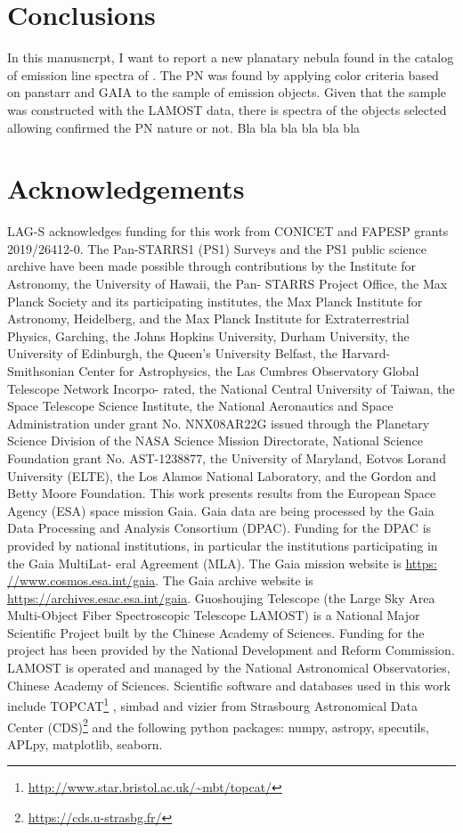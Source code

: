 \documentclass[fleqn,usenatbib]{mnras}
\begin{document}
{\section{Conclusions}
\label{sec:conclu}

In this manusncrpt, I want to report a new planatary nebula found
in the catalog of emission line spectra of \citet{Skoda:2020}.
The PN was found by applying color criteria based on panstarr
and GAIA to the sample of emission objects.
Given that the \citet{Skoda:2020} sample was constructed
with the LAMOST data, there is spectra of the objects selected
allowing confirmed the PN nature or not.
Bla bla bla bla bla bla

\section*{Acknowledgements}

LAG-S acknowledges funding for this work
from CONICET and FAPESP grants 2019/26412-0.
The Pan-STARRS1 (PS1) Surveys and the PS1 public science
archive have been made possible through contributions by the
Institute for Astronomy, the University of Hawaii, the Pan-
STARRS Project Office, the Max Planck Society and its
participating institutes, the Max Planck Institute for Astronomy,
Heidelberg, and the Max Planck Institute for Extraterrestrial
Physics, Garching, the Johns Hopkins University, Durham
University, the University of Edinburgh, the Queen’s University
Belfast, the Harvard-Smithsonian Center for Astrophysics, the
Las Cumbres Observatory Global Telescope Network Incorpo-
rated, the National Central University of Taiwan, the Space
Telescope Science Institute, the National Aeronautics and Space
Administration under grant No. NNX08AR22G issued through
the Planetary Science Division of the NASA Science Mission
Directorate, National Science Foundation grant No. AST-1238877,
the University of Maryland, Eotvos Lorand University
(ELTE), the Los Alamos National Laboratory, and the Gordon
and Betty Moore Foundation.
This work presents results from the European Space Agency
(ESA) space mission Gaia. Gaia data are being processed by
the Gaia Data Processing and Analysis Consortium (DPAC).
Funding for the DPAC is provided by national institutions, in
particular the institutions participating in the Gaia MultiLat-
eral Agreement (MLA). The Gaia mission website is \url{https:
//www.cosmos.esa.int/gaia}. The Gaia archive website is
\url{https://archives.esac.esa.int/gaia}.
Guoshoujing Telescope (the Large Sky Area Multi-Object Fiber Spectroscopic
Telescope LAMOST) is a National Major Scientific Project built by the Chinese
Academy of Sciences. Funding for the project has been provided by the National
Development and Reform Commission. LAMOST is operated and managed by the
National Astronomical Observatories, Chinese Academy of Sciences.
Scientific software
and databases used in this work include 
TOPCAT\footnote{\url{http://www.star.bristol.ac.uk/~mbt/topcat/}} \citep{Taylor:2005}, 
simbad and vizier from Strasbourg Astronomical Data Center (CDS)\footnote{\url{https://cds.u-strasbg.fr/}} 
and the following  python packages: numpy, astropy, specutils, APLpy, matplotlib, seaborn.
}
\end{document}

